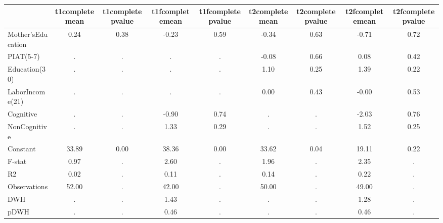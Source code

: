 \begin{table}[htbp]
\begin{tabular}{lcccccccc} \hline \hline
 & t1completemean  & t1completepvalue  & t1fcompletemean  & t1fcompletepvalue  & t2completemean  & t2completepvalue  & t2fcompletemean  & t2fcompletepvalue  \\  \hline 
Mother'sEducation &         0.24 &         0.38 &        -0.23 &         0.59 &        -0.34 &         0.63 &        -0.71 &         0.72 \\  
PIAT(5-7) &            . &            . &            . &            . &        -0.08 &         0.66 &         0.08 &         0.42 \\  
Education(30) &            . &            . &            . &            . &         1.10 &         0.25 &         1.39 &         0.22 \\  
LaborIncome(21) &            . &            . &            . &            . &         0.00 &         0.43 &        -0.00 &         0.53 \\  
Cognitive &            . &            . &        -0.90 &         0.74 &            . &            . &        -2.03 &         0.76 \\  
NonCognitive &            . &            . &         1.33 &         0.29 &            . &            . &         1.52 &         0.25 \\  
Constant &        33.89 &         0.00 &        38.36 &         0.00 &        33.62 &         0.04 &        19.11 &         0.22 \\  
F-stat &         0.97 &            . &         2.60 &            . &         1.96 &            . &         2.35 &            . \\  
R2 &         0.02 &            . &         0.11 &            . &         0.14 &            . &         0.22 &            . \\  
Observations &        52.00 &            . &        42.00 &            . &        50.00 &            . &        49.00 &            . \\  
DWH &            . &            . &         1.43 &            . &            . &            . &         1.28 &            . \\  
pDWH &            . &            . &         0.46 &            . &            . &            . &         0.46 &            . \\  
\hline \hline \end{tabular}
\end{table}
